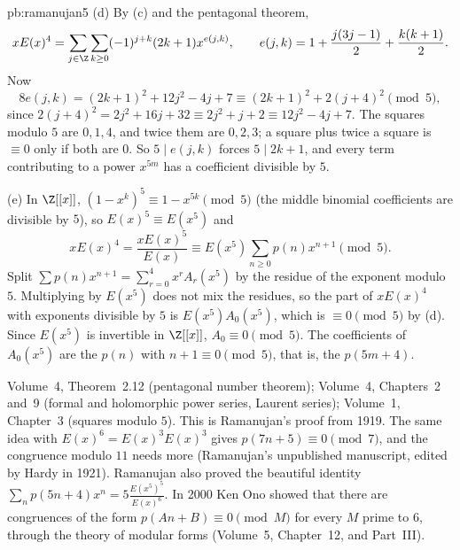 \begin{solution}{pb:ramanujan5}
(d) By (c) and the pentagonal theorem,
\[
xE(x)^4=\sum_{j\in\Z}\sum_{k\ge0}(-1)^{j+k}(2k+1)x^{e(j,k)},\qquad e(j,k)=1+\frac{j(3j-1)}2+\frac{k(k+1)}2.
\]
Now
\[
8e(j,k)=(2k+1)^2+12j^2-4j+7\equiv(2k+1)^2+2(j+4)^2\pmod5,
\]
since $2(j+4)^2=2j^2+16j+32\equiv2j^2+j+2\equiv12j^2-4j+7$. The squares modulo $5$ are $0,1,4$, and twice them are $0,2,3$; a
square plus twice a square is $\equiv0$ only if both are $0$. So $5\mid e(j,k)$ forces $5\mid2k+1$, and every term contributing to a
power $x^{5m}$ has a coefficient divisible by $5$.

(e) In $\Z[[x]]$, $(1-x^k)^5\equiv1-x^{5k}\pmod5$ (the middle binomial coefficients are divisible by $5$), so $E(x)^5\equiv E(x^5)$ and
\[
xE(x)^4=\frac{xE(x)^5}{E(x)}\equiv E(x^5)\sum_{n\ge0}p(n)x^{n+1}\pmod5.
\]
Split $\sum p(n)x^{n+1}=\sum_{r=0}^4x^rA_r(x^5)$ by the residue of the exponent modulo $5$. Multiplying by $E(x^5)$ does not mix the
residues, so the part of $xE(x)^4$ with exponents divisible by $5$ is $E(x^5)A_0(x^5)$, which is $\equiv0\pmod5$ by (d). Since
$E(x^5)$ is invertible in $\Z[[x]]$, $A_0\equiv0\pmod5$. The coefficients of $A_0(x^5)$ are the $p(n)$ with $n+1\equiv0\pmod5$, that
is, the $p(5m+4)$.

\tools Volume~4, Theorem~2.12 (pentagonal number theorem); Volume~4, Chapters~2 and~9 (formal and holomorphic power series,
Laurent series); Volume~1, Chapter~3 (squares modulo $5$).
\leads This is Ramanujan's proof from 1919. The same idea with $E(x)^6=E(x)^3E(x)^3$ gives $p(7n+5)\equiv0\pmod7$, and the
congruence modulo $11$ needs more (Ramanujan's unpublished manuscript, edited by Hardy in 1921). Ramanujan also proved the
beautiful identity $\sum_np(5n+4)x^n=5\frac{E(x^5)^5}{E(x)^6}$. In 2000 Ken Ono showed that there are congruences of the form
$p(An+B)\equiv0\pmod M$ for every $M$ prime to $6$, through the theory of modular forms (Volume~5, Chapter~12, and Part~III).
\end{solution}

